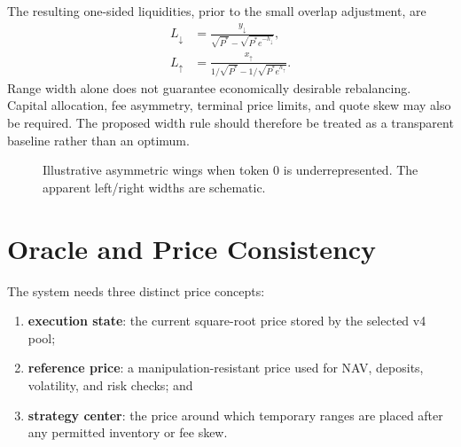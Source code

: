 \documentclass[11pt]{article}
\begin{document}
The resulting one-sided liquidities, prior to the small overlap adjustment, are
\begin{align}
  L_{\downarrow}
  &=\frac{y_{\downarrow}}
  {\sqrt{P^*}-\sqrt{P^*e^{-h_{\downarrow}}}},\\
  L_{\uparrow}
  &=\frac{x_{\uparrow}}
  {1/\sqrt{P^*}-1/\sqrt{P^*e^{h_{\uparrow}}}}.
  \label{eq:wingliq}
\end{align}
Range width alone does not guarantee economically desirable rebalancing.
Capital allocation, fee asymmetry, terminal price limits, and quote skew may
also be required. The proposed width rule should therefore be treated as a
transparent baseline rather than an optimum.

\begin{figure}[ht]
\centering
{}
\caption{Illustrative asymmetric wings when token $0$ is underrepresented.
The apparent left/right widths are schematic.}
\label{fig:wings}
\end{figure}

\section{Oracle and Price Consistency}

The system needs three distinct price concepts:

\begin{enumerate}
  \item \textbf{execution state}: the current square-root price stored by the
        selected v4 pool;
  \item \textbf{reference price}: a manipulation-resistant price used for NAV,
        deposits, volatility, and risk checks; and
  \item \textbf{strategy center}: the price around which temporary ranges are
        placed after any permitted inventory or fee skew.
\end{enumerate}
\end{document}
